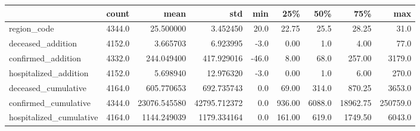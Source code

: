 \begin{tabular}{lrrrrrrrr}
\toprule
{} &   count &          mean &           std &   min &     25\% &     50\% &       75\% &       max \\
\midrule
region\_code             &  4344.0 &     25.500000 &      3.452450 &  20.0 &   22.75 &    25.5 &     28.25 &      31.0 \\
deceased\_addition       &  4152.0 &      3.665703 &      6.923995 &  -3.0 &    0.00 &     1.0 &      4.00 &      77.0 \\
confirmed\_addition      &  4332.0 &    244.049400 &    417.929016 & -46.0 &    8.00 &    68.0 &    257.00 &    3179.0 \\
hospitalized\_addition   &  4152.0 &      5.698940 &     12.976320 &  -3.0 &    0.00 &     1.0 &      6.00 &     270.0 \\
deceased\_cumulative     &  4164.0 &    605.770653 &    692.735743 &   0.0 &   69.00 &   314.0 &    870.25 &    3653.0 \\
confirmed\_cumulative    &  4344.0 &  23076.545580 &  42795.712372 &   0.0 &  936.00 &  6088.0 &  18962.75 &  250759.0 \\
hospitalized\_cumulative &  4164.0 &   1144.249039 &   1179.334164 &   0.0 &  161.00 &   619.0 &   1749.50 &    6043.0 \\
\bottomrule
\end{tabular}
